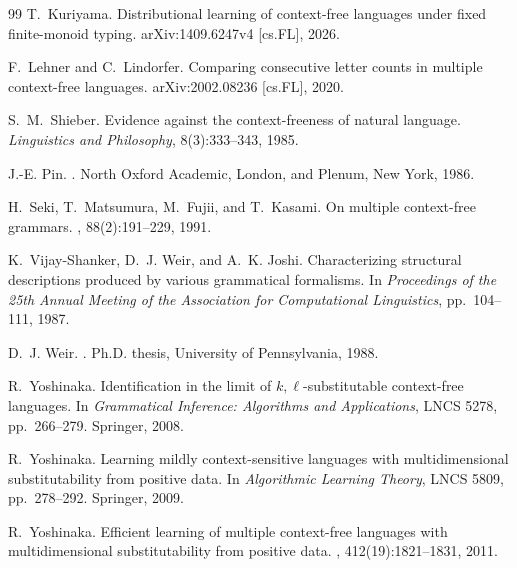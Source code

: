 \documentclass[11pt,a4paper]{article}
\theoremstyle{remark}
\begin{document}
\begin{thebibliography}{99}
T.~Kuriyama.
\newblock Distributional learning of context-free languages under fixed finite-monoid typing.
\newblock arXiv:1409.6247v4 [cs.FL], 2026.


F.~Lehner and C.~Lindorfer.
\newblock Comparing consecutive letter counts in multiple context-free languages.
\newblock arXiv:2002.08236 [cs.FL], 2020.

S.~M.~Shieber.
\newblock Evidence against the context-freeness of natural language.
\newblock \emph{Linguistics and Philosophy}, 8(3):333--343, 1985.

J.-E. Pin.
.
\newblock North Oxford Academic, London, and Plenum, New York, 1986.

H.~Seki, T.~Matsumura, M.~Fujii, and T.~Kasami.
\newblock On multiple context-free grammars.
, 88(2):191--229, 1991.

K.~Vijay-Shanker, D.~J. Weir, and A.~K. Joshi.
\newblock Characterizing structural descriptions produced by various grammatical formalisms.
\newblock In {\em Proceedings of the 25th Annual Meeting of the Association for
Computational Linguistics}, pp.~104--111, 1987.

D.~J. Weir.
.
\newblock Ph.D. thesis, University of Pennsylvania, 1988.

R.~Yoshinaka.
\newblock Identification in the limit of \(k,\ell\)-substitutable context-free
languages.
\newblock In {\em Grammatical Inference: Algorithms and Applications}, LNCS
5278, pp.~266--279. Springer, 2008.

R.~Yoshinaka.
\newblock Learning mildly context-sensitive languages with multidimensional
substitutability from positive data.
\newblock In {\em Algorithmic Learning Theory}, LNCS 5809, pp.~278--292.
Springer, 2009.

R.~Yoshinaka.
\newblock Efficient learning of multiple context-free languages with
multidimensional substitutability from positive data.
, 412(19):1821--1831, 2011.

\end{thebibliography}
\end{document}
